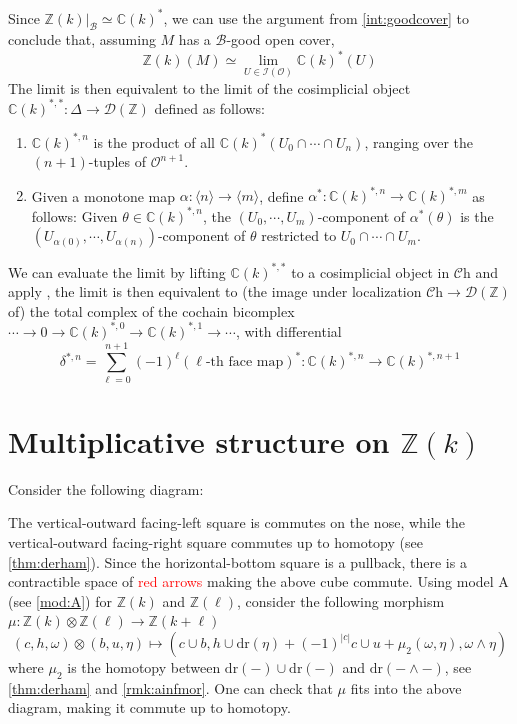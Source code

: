 \documentclass[a4paper]{book}
\newcommand{\lB}{\mathcal{B}}
\newcommand{\lC}{\mathcal{C}}
\newcommand{\bC}{\mathbb{C}}
\newcommand{\lD}{\mathcal{D}}
\newcommand{\lI}{\mathcal{I}}
\newcommand{\rO}{\mathscr{O}}
\newcommand{\bR}{\mathbb{R}}
\newcommand{\bZ}{\mathbb{Z}}
\newcommand{\Ch}{\lC\mathrm{h}} %
\theoremstyle{definition}
\theoremstyle{remark}
\numberwithin{equation}{section}
\begin{document}
Since $\bZ(k)|_\lB\simeq\bC(k)^*$, we can use the argument from \cref{int:goodcover} to conclude that, assuming $M$ has a $\lB$-good open cover, 
\[
    {\bZ}(k)(M)\simeq\lim_{U\in\lI(\mathscr O)} \bC(k)^*(U)
  \]
  The limit is then equivalent to the limit of the cosimplicial object $\bC(k)^{*,*}:\Delta\to\lD(\bZ)$ defined as follows:
  \begin{enumerate}
    \item $\bC(k)^{*,n}$ is the product of all $\bC(k)^*(U_0\cap\cdots\cap U_n)$, ranging over the $(n+1)$-tuples of $\rO^{n+1}$. 
    \item Given a monotone map $\alpha:\langle n\rangle\to\langle m\rangle$, define $\alpha^*:\bC(k)^{*,n}\to\bC(k)^{*,m}$ as follows: Given $\theta\in\bC(k)^{*,n}$, the $(U_0,\cdots,U_m)$-component of $\alpha^*(\theta)$ is the $(U_{\alpha(0)},\cdots,U_{\alpha(n)})$-component of $\theta$ restricted to $U_0\cap\cdots\cap U_m$.
  \end{enumerate}
  We can evaluate the limit by lifting $\bC(k)^{*,*}$ to a cosimplicial object in $\Ch$ and apply \cite[Lemma 7.10]{bunkenikolausvoelkl2016diffcoh}, the limit is then equivalent to (the image under localization $\Ch\to\lD(\bZ)$ of) the total complex of the cochain bicomplex $\cdots\to 0\to \bC(k)^{*,0}\to\bC(k)^{*,1}\to\cdots$, with differential \[\delta^{*,n}=\sum_{\ell=0}^{n+1}(-1)^\ell(\ell\mbox{-th face map})^*:\bC(k)^{*,n}\to\bC(k)^{*,n+1}\] 

\section{Multiplicative structure on \texorpdfstring{$\bZ(k)$}{Z(k)}}

Consider the following diagram:
\begin{center}
\end{center}The vertical-outward facing-left square is commutes on the nose, while the vertical-outward facing-right square commutes up to homotopy (see \cref{thm:derham}). Since the horizontal-bottom square is a pullback, there is a contractible space of \textcolor{red}{red arrows} making the above cube commute. Using model A (see \cref{mod:A}) for $\bZ(k)$ and $\bZ(\ell)$, consider the following morphism $\mu:\bZ(k)\otimes\bZ(\ell)\to\bZ(k+\ell)$ \[(c,h,\omega)\otimes(b,u,\eta)\mapsto(c\cup b,h\cup \mathrm{dr}(\eta)+(-1)^{|c|}c\cup u+\mu_2(\omega,\eta),\omega\wedge\eta)\]where $\mu_2$ is the homotopy between $\mathrm{dr}(-)\cup\mathrm{dr}(-)$ and $\mathrm{dr}(-\wedge-)$, see \cref{thm:derham} and \cref{rmk:ainfmor}. One can check that $\mu$ fits into the above diagram, making it commute up to homotopy. 
\end{document}
